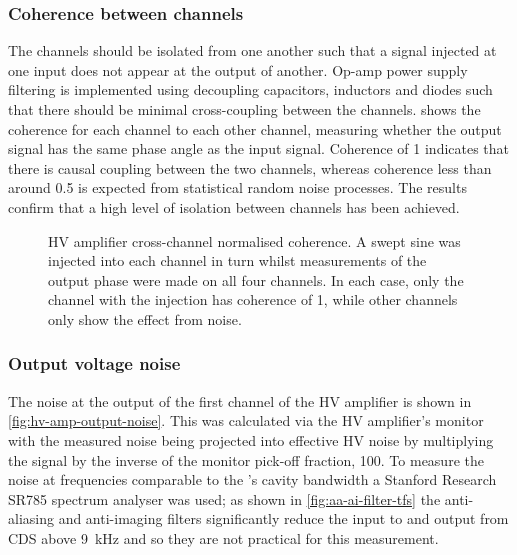\subsubsection{Coherence between channels}
The channels should be isolated from one another such that a signal injected at one input does not appear at the output of another. Op-amp power supply filtering is implemented using decoupling capacitors, inductors and diodes such that there should be minimal cross-coupling between the channels.  shows the coherence for each channel to each other channel, measuring whether the output signal has the same phase angle as the input signal. Coherence of \num{1} indicates that there is causal coupling between the two channels, whereas coherence less than around \num{0.5} is expected from statistical random noise processes. The results confirm that a high level of isolation between channels has been achieved.

\begin{figure}
  \centering
  
  \caption[High voltage amplifier cross-channel coherence]{\gls{HV} amplifier cross-channel normalised coherence. A swept sine was injected into each channel in turn whilst measurements of the output phase were made on all four channels. In each case, only the channel with the injection has coherence of \num{1}, while other channels only show the effect from noise.}
  \label{fig:hv-amp-coherence}
\end{figure}

\subsubsection{Output voltage noise}
The noise at the output of the first channel of the \gls{HV} amplifier is shown in \cref{fig:hv-amp-output-noise}. This was calculated via the \gls{HV} amplifier's monitor with the measured noise being projected into effective \gls{HV} noise by multiplying the signal by the inverse of the monitor pick-off fraction, \num{100}. To measure the noise at frequencies comparable to the \SSMEXPT{}'s cavity bandwidth a Stanford Research SR785 spectrum analyser was used; as shown in \cref{fig:aa-ai-filter-tfs} the anti-aliasing and anti-imaging filters significantly reduce the input to and output from \gls{CDS} above \SI{9}{\kilo\hertz} and so they are not practical for this measurement.

